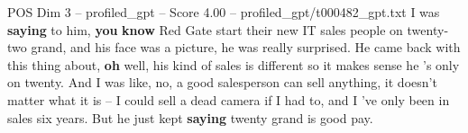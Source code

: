 \begin{textsample}{POS Dim 3 – profiled\_gpt – Score 4.00 – profiled\_gpt/t000482\_gpt.txt}  \label{ex:f3_pos_030}
I was \textbf{saying} to him, \textbf{you} \textbf{know} Red Gate start their new IT sales people on twenty-two grand, and his face was a picture, he was really surprised.
He came back with this thing about, \textbf{oh} well, his kind of sales is different so it makes sense he ’s only on twenty.
And I was like, no, a good salesperson can sell anything, it doesn't matter what it is – I could sell a dead camera if I had to, and I ’ve only been in sales six years.
But he just kept \textbf{saying} twenty grand is good pay.

\end{textsample}
